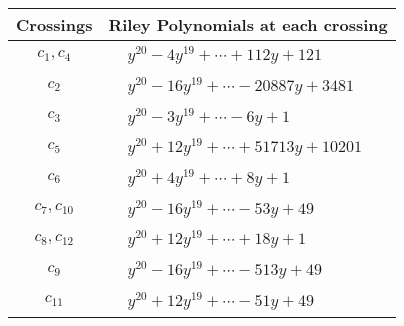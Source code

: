 \documentclass[1p]{elsarticle_modified}
\theoremstyle{definition}
\begin{document}
\begin{tabular}{m{50pt}|m{274pt}}
Crossings & \hspace{64pt}Riley Polynomials at each crossing \\
\hline $$\begin{aligned}c_{1},c_{4}\end{aligned}$$&$\begin{aligned}
&y^{20}-4 y^{19}+\cdots+112 y+121
\end{aligned}$\\
\hline $$\begin{aligned}c_{2}\end{aligned}$$&$\begin{aligned}
&y^{20}-16 y^{19}+\cdots-20887 y+3481
\end{aligned}$\\
\hline $$\begin{aligned}c_{3}\end{aligned}$$&$\begin{aligned}
&y^{20}-3 y^{19}+\cdots-6 y+1
\end{aligned}$\\
\hline $$\begin{aligned}c_{5}\end{aligned}$$&$\begin{aligned}
&y^{20}+12 y^{19}+\cdots+51713 y+10201
\end{aligned}$\\
\hline $$\begin{aligned}c_{6}\end{aligned}$$&$\begin{aligned}
&y^{20}+4 y^{19}+\cdots+8 y+1
\end{aligned}$\\
\hline $$\begin{aligned}c_{7},c_{10}\end{aligned}$$&$\begin{aligned}
&y^{20}-16 y^{19}+\cdots-53 y+49
\end{aligned}$\\
\hline $$\begin{aligned}c_{8},c_{12}\end{aligned}$$&$\begin{aligned}
&y^{20}+12 y^{19}+\cdots+18 y+1
\end{aligned}$\\
\hline $$\begin{aligned}c_{9}\end{aligned}$$&$\begin{aligned}
&y^{20}-16 y^{19}+\cdots-513 y+49
\end{aligned}$\\
\hline $$\begin{aligned}c_{11}\end{aligned}$$&$\begin{aligned}
&y^{20}+12 y^{19}+\cdots-51 y+49
\end{aligned}$\\
\hline
\end{tabular}\\~\\
\end{document}
